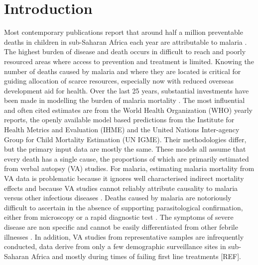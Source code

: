 \documentclass[12pt]{article}
\begin{document}
\section*{Introduction}




Most contemporary publications report that around half a million preventable deaths in children in sub-Saharan Africa each year  are attributable to malaria  \cite{wmr}. The highest burden of disease and death occurs in difficult to reach and poorly resourced areas where access to prevention and treatment is limited. Knowing the number of deaths caused by malaria and where they are located is critical for guiding allocation of scarce resources, especially now with reduced overseas development aid for health. Over the last 25 years, substantial investments have been made in modelling the burden of malaria mortality \cite{gates2017ihme}. The most influential and often cited estimates are from the World Health Organization (WHO) yearly reports, the openly available model based predictions from the Institute for Health Metrics and Evaluation (IHME) and the United Nations Inter-agency Group for Child Mortality Estimation (UN IGME). Their methodologies differ, but the primary input data are mostly the same. These models all assume that every death has a single cause, the proportions of which are primarily estimated from verbal autopsy (VA) studies. For malaria, estimating malaria mortality from VA data is problematic because it ignores well characterised indirect mortality effects \cite{scott,Uyoga:19,Muriuki:21} and because VA studies cannot reliably attribute causality to malaria versus other infectious diseases \cite{todd1994,snowva1992}. Deaths caused by malaria are notoriously difficult to ascertain in the absence of supporting parasitological confirmation, either from microscopy or a rapid diagnostic test \cite{reyburn2004overdiagnosis}. The symptoms of severe disease are non specific and cannot be easily differentiated from other febrile illnesses \cite{white_misdiagnosis,Watson:22}. In addition, VA studies from representative samples are infrequently conducted, data derive from only a few demographic surveillance sites in sub-Saharan Africa and mostly during times of failing first line treatments [REF].
\end{document}
